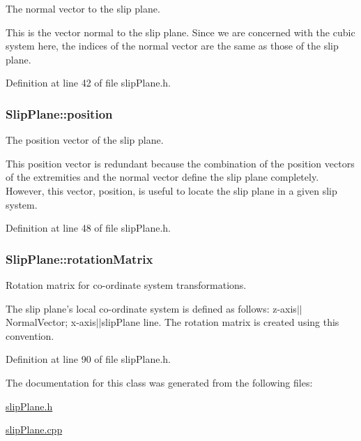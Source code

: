The normal vector to the slip plane. 

This is the vector normal to the slip plane. Since we are concerned with the cubic system here, the indices of the normal vector are the same as those of the slip plane. 

Definition at line 42 of file slip\-Plane.\-h.

\hypertarget{classSlipPlane_ac2ac59e22e9638a990c9e45aaa096d9a}{
\subsubsection[{position}]{ Slip\-Plane\-::position\hspace{0.3cm}{\ttfamily [protected]}}}\label{db/d25/classSlipPlane_ac2ac59e22e9638a990c9e45aaa096d9a}


The position vector of the slip plane. 

This position vector is redundant because the combination of the position vectors of the extremities and the normal vector define the slip plane completely. However, this vector, position, is useful to locate the slip plane in a given slip system. 

Definition at line 48 of file slip\-Plane.\-h.

\hypertarget{classSlipPlane_a1aa5aacccb6bb03d163a95251aa10d6c}{
\subsubsection[{rotation\-Matrix}]{ Slip\-Plane\-::rotation\-Matrix\hspace{0.3cm}{\ttfamily [protected]}}}\label{db/d25/classSlipPlane_a1aa5aacccb6bb03d163a95251aa10d6c}


Rotation matrix for co-\/ordinate system transformations. 

The slip plane's local co-\/ordinate system is defined as follows\-: z-\/axis$|$$|$\-Normal\-Vector; x-\/axis$|$$|$slip\-Plane line. The rotation matrix is created using this convention. 

Definition at line 90 of file slip\-Plane.\-h.



The documentation for this class was generated from the following files\-:\begin{DoxyCompactItemize}
\item 
\hyperlink{slipPlane_8h}{slip\-Plane.\-h}\item 
\hyperlink{slipPlane_8cpp}{slip\-Plane.\-cpp}\end{DoxyCompactItemize}

